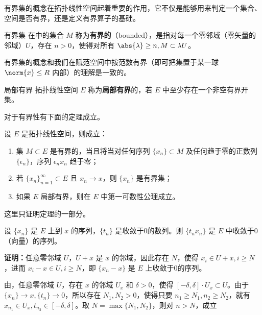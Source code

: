 
有界集的概念在拓扑线性空间起着重要的作用，它不仅是能够用来判定一个集合、空间是否有界，还是定义有界算子的基础。

\begin{definition}{有界集}\label{def_BudSet_1}
在中的集合 $M$ 称为\textbf{有界的}（bounded），是指对每一个零邻域（零矢量的邻域）$U$，存在 $n>0$，使得对所有 $\abs{\lambda}\geq n,M\subset \lambda U$。 
\end{definition}
有界集的概念和我们在赋范空间中按范数有界（即可把集置于某一球 $\norm{x}\leq R$ 内部）的理解是一致的。

\begin{definition}{局部有界}
拓扑线性空间 $E$ 称为\textbf{局部有界}的，若 $E$ 中至少存在一个非空有界开集。
\end{definition}


对于有界性有下面的定理成立。
\begin{theorem}{}\label{the_BudSet_1}
设 $E$ 是拓扑线性空间，则成立：
\begin{enumerate}
\item 集 $M\subset E$ 是有界的，当且将当对任何序列 $\{x_n\}\subset M$ 及任何趋于零的正数列 $\{\epsilon_n\}$，序列 $\epsilon_n x_n$ 趋于零；
\item 若 $\{x_n\}_{n=1}^\infty\subset E$ 且 $x_n\rightarrow x$，则 $\{x_n\}$ 是有界集；
\item 如果 $E$ 局部有界，则在 $E$ 中第一可数性公理成立。 
\end{enumerate}

\end{theorem}
这里只证明定理的一部分。


\begin{lemma}{}
设 $\{x_n\}$ 是 $E$ 上到 $x$ 的序列，$\{t_n\}$ 是收敛于0的数列。则 $\{t_nx_n\}$ 是 $E$ 中收敛于0（向量）的序列。
\end{lemma}

\textbf{证明：}任意零邻域 $U$，$U+x$ 是 $x$ 的邻域，因此存在 $N$，使得 $x_i\in U+x,i\geq N$，进而 $x_i-x\in U,i\geq N$，即 $\{x_n-x\}$ 是 $E$ 上收敛于0的序列。

由，任意零邻域 $U$，存在 $x$ 的邻域 $U_x$ 和 $\delta>0$，使得 $[-\delta,\delta]\cdot U_x\subset U$。由于 $\{x_n\}\rightarrow x,\{t_n\}\rightarrow0$，所以存在 $N_1,N_2>0$，使得只要 $n_1\geq N_1,n_2\geq N_2$，就有 $x_{n_1}\in U_x,t_{n_2}\in[-\delta,\delta]$。取 $N=\max\{N_1,N_2\}$，则对 $n>N$，成立

